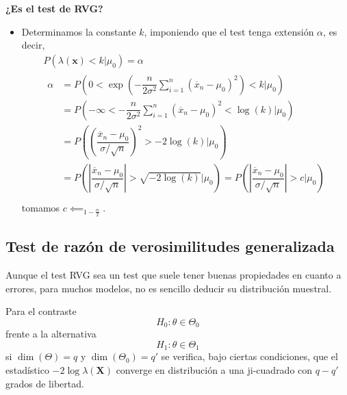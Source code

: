 \textbf{¿Es el test de RVG?} 
\begin{itemize}[label=\textbullet]
    \item Determinamos la constante $k$, imponiendo que el test tenga extensión  $\alpha$, es decir, \[
    \begin{array}{c}
        P(\lambda(\mathbf{x})<k|\mu_0)=\alpha\\
        \begin{aligned}
            \alpha&= P\left( 0<\exp\left( -\dfrac{n}{2\sigma^2}\sum_{i=1}^{n} (\overline{x}_n-\mu_0)^2 \right) <k|\mu_0 \right)  \\
            &= P\left( -\infty<-\dfrac{n}{2\sigma^2}\sum_{i=1}^{n} (\overline{x}_n-\mu_0)^2<\log(k)|\mu_0 \right)  \\
            &= P\left( \left( \dfrac{\overline{x}_n-\mu_0}{\sigma / \sqrt{n} } \right) ^2>-2\log(k)|\mu_0 \right)  \\
            &= P\left( \left| \dfrac{\overline{x}_n-\mu_0}{\sigma / \sqrt{n} } \right| >\sqrt{-2\log(k)}|\mu_0  \right)=P\left( \left| \dfrac{\overline{x}_n-\mu_0}{\sigma /\sqrt{n} } \right| >c|\mu_0 \right)   \\
        \end{aligned}
    \end{array}
    \] tomamos $c\impliedby_{1-\frac{\alpha}{2} }$.
\end{itemize}
\subsection{Test de razón de verosimilitudes generalizada}
\begin{tcolorbox}[colback=olive!5!white, colframe=olive!75!black, title=\textbf{Lo más difícil}]
Aunque el test RVG sea un test que suele tener buenas propiedades en cuanto a errores, para muchos modelos, no es sencillo deducir su distribución muestral.
\end{tcolorbox}
\begin{tcolorbox}[colback=blue!5!white, colframe=blue!75!black, title=\textbf{Aproximación asintótica de la distribución muestral para el test RVG}]
Para el contraste \[
H_0:\theta\in \Theta_0
\] frente a la alternativa \[
H_1:\theta\in \Theta_1
\] si $\dim(\Theta)=q$ y  $\dim(\Theta_0)=q'$ se verifica, bajo ciertas condiciones, que el estadístico $-2\log\lambda(\mathbf{X})$ converge en distribución a una ji-cuadrado con $q-q'$ grados de libertad.
\end{tcolorbox}
